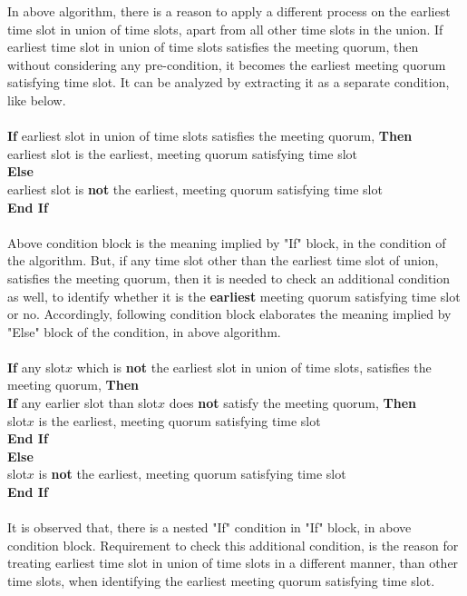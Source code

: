 In above algorithm, there is a reason to apply a different process on the earliest time slot in union of time slots, apart from all other time slots in the union. If earliest time slot in union of time slots satisfies the meeting quorum, then without considering any pre-condition, it becomes the earliest meeting quorum satisfying time slot. It can be analyzed by extracting it as a separate condition, like below. \\ \\
\textbf{If} earliest slot in union of time slots satisfies the meeting quorum, \textbf{Then} \\
\indent earliest slot is the earliest, meeting quorum satisfying time slot \\
\textbf{Else}\\
\indent earliest slot is \textbf{not} the earliest, meeting quorum satisfying time slot \\
\textbf{End If}  \\ \\
Above condition block is the meaning implied by "If" block, in the condition of the algorithm. But, if any time slot other than the earliest time slot of union, satisfies the meeting quorum, then it is needed to check an additional condition as well, to identify whether it is the \textbf{earliest} meeting quorum satisfying time slot or no. Accordingly, following condition block elaborates the meaning implied by "Else" block of the condition, in above algorithm. \\ \\             
\textbf{If} any slot$x$ which is \textbf{not} the earliest slot in union of time slots, satisfies the meeting quorum, \textbf{Then} \\
\indent \textbf{If} any earlier slot than slot$x$ does \textbf{not} satisfy the meeting quorum, \textbf{Then} \\
\indent \indent slot$x$ is the earliest, meeting quorum satisfying time slot \\
\indent \textbf{End If}\\
\textbf{Else}\\
\indent slot$x$ is \textbf{not} the earliest, meeting quorum satisfying time slot \\
\textbf{End If}  \\ \\
It is observed that, there is a nested "If" condition in "If" block, in above condition block. Requirement to check this additional condition, is the reason for treating earliest time slot in union of time slots in a different manner, than other time slots, when identifying the earliest meeting quorum satisfying time slot.\\ \\
